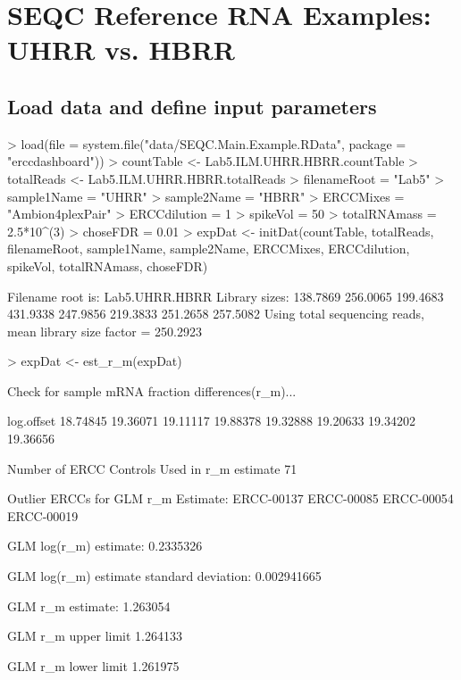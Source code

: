 \documentclass{article}
\begin{document}
\section{SEQC Reference RNA Examples: UHRR vs. HBRR}
\subsection{Load data and define input parameters}
\begin{Schunk}
\begin{Sinput}
> load(file = system.file("data/SEQC.Main.Example.RData", 
                          package = "erccdashboard"))
> countTable <- Lab5.ILM.UHRR.HBRR.countTable
> totalReads <- Lab5.ILM.UHRR.HBRR.totalReads
> filenameRoot = "Lab5"
> sample1Name = "UHRR"
> sample2Name = "HBRR"
> ERCCMixes = "Ambion4plexPair"
> ERCCdilution = 1
> spikeVol = 50
> totalRNAmass = 2.5*10^(3)
> choseFDR = 0.01
> expDat <- initDat(countTable, totalReads, filenameRoot, sample1Name,
                    sample2Name, ERCCMixes, ERCCdilution, spikeVol, totalRNAmass,
                    choseFDR)
\end{Sinput}
\begin{Soutput}
Filename root is: Lab5.UHRR.HBRR 
Library sizes:
138.7869 256.0065 199.4683 431.9338 247.9856 219.3833 251.2658 257.5082
Using total sequencing reads,
 mean library size factor = 250.2923
\end{Soutput}
\end{Schunk}

\begin{Schunk}
\begin{Sinput}
> expDat <- est_r_m(expDat)
\end{Sinput}
\begin{Soutput}
Check for sample mRNA fraction differences(r_m)...

log.offset
18.74845 19.36071 19.11117 19.88378 19.32888 19.20633 19.34202 19.36656 

Number of ERCC Controls Used in r_m estimate
71 

Outlier ERCCs for GLM r_m Estimate:
ERCC-00137 ERCC-00085 ERCC-00054 ERCC-00019 

GLM log(r_m) estimate:
0.2335326 

GLM log(r_m) estimate standard deviation:
0.002941665 
 
GLM r_m estimate:
1.263054 

GLM r_m upper limit
1.264133 

GLM r_m lower limit
1.261975 
\end{Soutput}
\end{Schunk}
\end{document}
